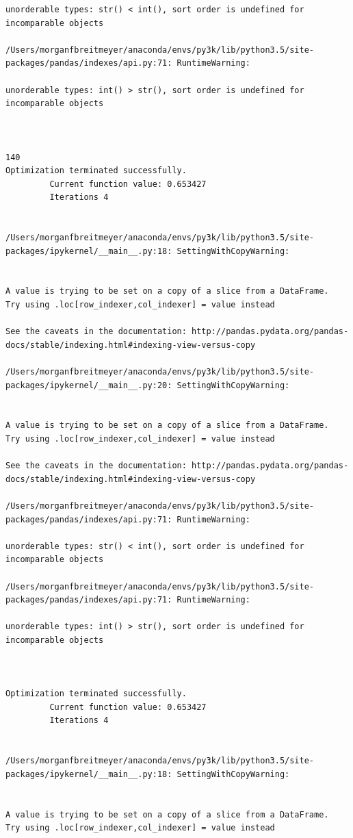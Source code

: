 \begin{lstlisting}
unorderable types: str() < int(), sort order is undefined for incomparable objects

/Users/morganfbreitmeyer/anaconda/envs/py3k/lib/python3.5/site-packages/pandas/indexes/api.py:71: RuntimeWarning:

unorderable types: int() > str(), sort order is undefined for incomparable objects



140
Optimization terminated successfully.
         Current function value: 0.653427
         Iterations 4


/Users/morganfbreitmeyer/anaconda/envs/py3k/lib/python3.5/site-packages/ipykernel/__main__.py:18: SettingWithCopyWarning:


A value is trying to be set on a copy of a slice from a DataFrame.
Try using .loc[row_indexer,col_indexer] = value instead

See the caveats in the documentation: http://pandas.pydata.org/pandas-docs/stable/indexing.html#indexing-view-versus-copy

/Users/morganfbreitmeyer/anaconda/envs/py3k/lib/python3.5/site-packages/ipykernel/__main__.py:20: SettingWithCopyWarning:


A value is trying to be set on a copy of a slice from a DataFrame.
Try using .loc[row_indexer,col_indexer] = value instead

See the caveats in the documentation: http://pandas.pydata.org/pandas-docs/stable/indexing.html#indexing-view-versus-copy

/Users/morganfbreitmeyer/anaconda/envs/py3k/lib/python3.5/site-packages/pandas/indexes/api.py:71: RuntimeWarning:

unorderable types: str() < int(), sort order is undefined for incomparable objects

/Users/morganfbreitmeyer/anaconda/envs/py3k/lib/python3.5/site-packages/pandas/indexes/api.py:71: RuntimeWarning:

unorderable types: int() > str(), sort order is undefined for incomparable objects



Optimization terminated successfully.
         Current function value: 0.653427
         Iterations 4


/Users/morganfbreitmeyer/anaconda/envs/py3k/lib/python3.5/site-packages/ipykernel/__main__.py:18: SettingWithCopyWarning:


A value is trying to be set on a copy of a slice from a DataFrame.
Try using .loc[row_indexer,col_indexer] = value instead


\end{lstlisting}
